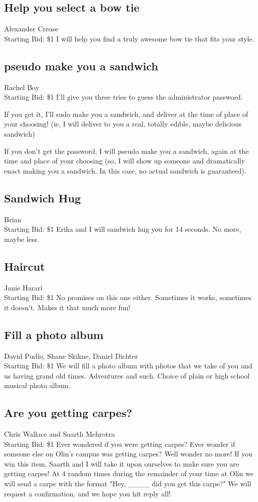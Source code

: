 \documentclass[11pt]{article}
\begin{document}
\subsection{Help you select a bow tie}
Alexander Crease
\\
Starting Bid: \$1
\newline
I will help you find a truly awesome bow tie that fits your style.
\subsection{pseudo make you a sandwich}
Rachel Boy
\\
Starting Bid: \$1
\newline
I'll give you three tries to guess the administrator password.  

If you get it, I'll sudo make you a sandwich, and deliver at the time of place of your choosing! (ie, I will deliver to you a real, totally edible, maybe delicious sandwich) 

If you don't get the password, I will pseudo make you a sandwich, again at the time and place of your choosing (so, I will show up someone and dramatically enact making you a sandwich. In this case, no actual sandwich is guaranteed).
\subsection{Sandwich Hug}
Brian
\\
Starting Bid: \$1
\newline
Erika and I will sandwich hug you for 14 seconds. No more, maybe less.
\subsection{Haircut}
Janie Harari
\\
Starting Bid: \$1
\newline
No promises on this one either.  Sometimes it works, sometimes it doesn't.  Makes it that much more fun!
\subsection{Fill a photo album}
David Pudlo, Shane Skikne, Daniel Dichter
\\
Starting Bid: \$1
\newline
We will fill a photo album with photos that we take of you and us having grand old times. Adventures and such. Choice of plain or high school musical photo album.
\subsection{Are you getting carpes?}
Chris Wallace and Saarth Mehrotra
\\
Starting Bid: \$1
\newline
Ever wondered if you were getting carpes? Ever wonder if someone else on Olin's campus was getting carpes? Well wonder no more! If you win this item, Saarth and I will take it upon ourselves to make sure you are getting carpes! At 4 random times during the remainder of your time at Olin we will send a carpe with the format "Hey, \_\_\_\_ did you get this carpe?" We will request a confirmation, and we hope you hit reply all!
\end{document}
